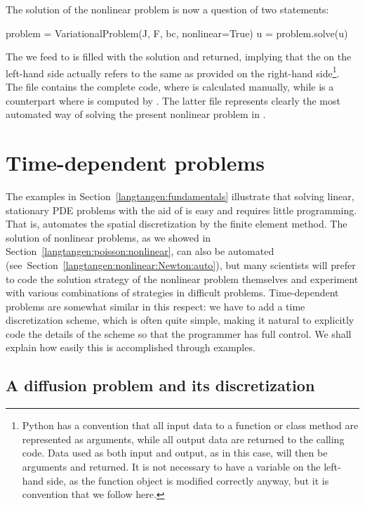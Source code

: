 The solution of the nonlinear problem is now a question of two statements:
\begin{python}
problem = VariationalProblem(J, F, bc, nonlinear=True)
u = problem.solve(u)
\end{python}
The  we feed to  is filled with the solution
and returned, implying that the  on the left-hand side actually
refers to the same  as provided on the right-hand side\footnote{Python
has a convention that all input data to a function or class method are
represented as arguments, while all output data are returned to the calling
code. Data used as both input and output, as in this case, will then be
arguments and returned. It is not necessary to have a variable on the
left-hand side, as the function object is modified correctly anyway,
but it is convention that we follow here.}.
The file  contains the complete code, where
 is calculated manually, while  is
a counterpart where  is computed by .
The latter file represents clearly the most automated way of solving
the present nonlinear problem in \fenics.

\section{Time-dependent problems}
\label{langtangen:timedep}

The examples in Section~\ref{langtangen:fundamentals} illustrate that
solving linear, stationary PDE problems with the aid of \fenics{} is
easy and requires little programming.  That is, \fenics{} automates
the spatial discretization by the finite element method.  The solution
of nonlinear problems, as we showed in
Section~\ref{langtangen:poisson:nonlinear}, can also be automated
(see~Section~\ref{langtangen:nonlinear:Newton:auto}), but many
scientists will prefer to code the solution strategy of the nonlinear
problem themselves and experiment with various combinations of
strategies in difficult problems. Time-dependent problems are somewhat
similar in this respect: we have to add a time discretization scheme,
which is often quite simple, making it natural to explicitly code the
details of the scheme so that the programmer has full control.  We
shall explain how easily this is accomplished through examples.

\subsection{A diffusion problem and its discretization}
\label{langtangen:timedep:diffusion1}

